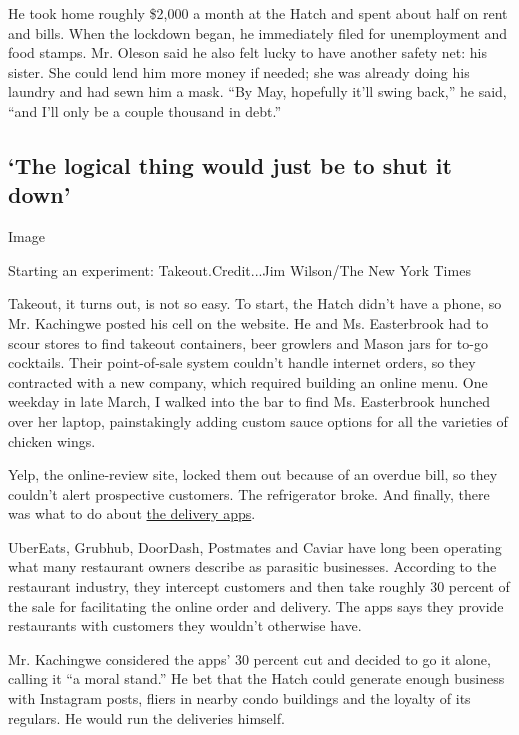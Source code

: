 He took home roughly \$2,000 a month at the Hatch and spent about half
on rent and bills. When the lockdown began, he immediately filed for
unemployment and food stamps. Mr. Oleson said he also felt lucky to have
another safety net: his sister. She could lend him more money if needed;
she was already doing his laundry and had sewn him a mask. ``By May,
hopefully it'll swing back,'' he said, ``and I'll only be a couple
thousand in debt.''

\hypertarget{the-logical-thing-would-just-be-to-shut-it-down}{%
\subsection{`The logical thing would just be to shut it
down'}\label{the-logical-thing-would-just-be-to-shut-it-down}}

Image

Starting an experiment: Takeout.Credit...Jim Wilson/The New York Times

Takeout, it turns out, is not so easy. To start, the Hatch didn't have a
phone, so Mr. Kachingwe posted his cell on the website. He and Ms.
Easterbrook had to scour stores to find takeout containers, beer
growlers and Mason jars for to-go cocktails. Their point-of-sale system
couldn't handle internet orders, so they contracted with a new company,
which required building an online menu. One weekday in late March, I
walked into the bar to find Ms. Easterbrook hunched over her laptop,
painstakingly adding custom sauce options for all the varieties of
chicken wings.

Yelp, the online-review site, locked them out because of an overdue
bill, so they couldn't alert prospective customers. The refrigerator
broke. And finally, there was what to do about
\href{https://www.nytimes3xbfgragh.onion/2020/06/09/technology/delivery-apps-restaurants-fees-virus.html}{the
delivery apps}.

UberEats, Grubhub, DoorDash, Postmates and Caviar have long been
operating what many restaurant owners describe as parasitic businesses.
According to the restaurant industry, they intercept customers and then
take roughly 30 percent of the sale for facilitating the online order
and delivery. The apps says they provide restaurants with customers they
wouldn't otherwise have.

Mr. Kachingwe considered the apps' 30 percent cut and decided to go it
alone, calling it ``a moral stand.'' He bet that the Hatch could
generate enough business with Instagram posts, fliers in nearby condo
buildings and the loyalty of its regulars. He would run the deliveries
himself.

